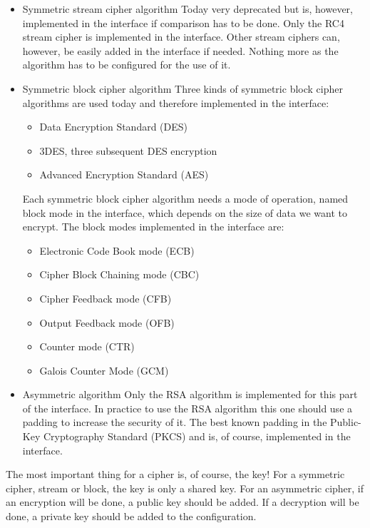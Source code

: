 \begin{itemize}
  \item Symmetric stream cipher algorithm\newline
Today very deprecated but is, however, implemented in the interface if
comparison has to be done.
Only the RC4 stream cipher is implemented in the interface.
Other stream ciphers can, however, be easily added in the interface if
needed.
Nothing more as the algorithm has to be configured for the use of
it.
  \item Symmetric block cipher algorithm\newline
  Three kinds of symmetric block cipher algorithms are used today and
therefore implemented in the interface:
\begin{itemize}[noitemsep]
  \item Data Encryption Standard (DES)
  \item 3DES, three subsequent DES encryption
  \item Advanced Encryption Standard (AES)  
\end{itemize}
Each symmetric block cipher algorithm needs a mode of operation, named block
mode in the interface, which depends on the size of data we want to
encrypt.\newline
The block modes implemented in the interface are:
\begin{itemize}[noitemsep]
  \item Electronic Code Book mode (ECB)
  \item Cipher Block Chaining mode (CBC)
  \item Cipher Feedback mode (CFB)
  \item Output Feedback mode (OFB)
  \item Counter mode (CTR)
  \item Galois Counter Mode (GCM)
\end{itemize}
  \item Asymmetric algorithm\newline
  Only the RSA algorithm is implemented for this part of the interface.
  In practice to use the RSA algorithm this one should use a padding to increase
  the security of it.
  The best known padding in the Public-Key Cryptography Standard (PKCS) and is,
of course, implemented in the interface.\newline  
\end{itemize} 
The most important thing for a cipher is, of course, the key!
For a symmetric cipher, stream or block, the key is only a shared key.
For an asymmetric cipher, if an encryption will be done, a public key should
be added. If a decryption will be done, a private key should be added to the
configuration.

